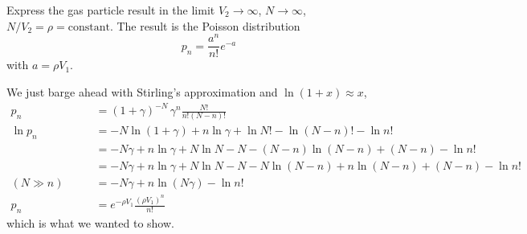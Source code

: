 

Express the gas particle result in the limit $V_2 \rightarrow \infty$, $N \rightarrow \infty$, $N/V_2 = \rho = \text{constant}$.
The result is the Poisson distribution
\begin{equation*}
p_n = \frac{a^n}{n!} e^{-a}
\end{equation*}
with $a = \rho V_1$.


We just barge ahead with Stirling's approximation and $\ln(1+x) \approx x$,
\begin{align*}
p_n
&= (1 + \gamma)^{-N} \, \gamma^n \frac{N!}{n! (N - n)!} \\
\ln p_n
&= -N \ln (1 + \gamma) + n \ln \gamma + \ln N! - \ln (N - n)! - \ln n! \\
&= -N \gamma + n \ln \gamma + N \ln N - N - (N - n)\ln(N - n) + (N - n) - \ln n! \\
&= -N \gamma + n \ln \gamma + N \ln N - N - N \ln(N - n) + n \ln(N - n) + (N - n) - \ln n! \\
(N \gg n) \qquad
&= -N \gamma + n \ln (N \gamma) - \ln n! \\
p_n
&= e^{-\rho V_1} \frac{(\rho V_1)^n}{n!}
\end{align*}
which is what we wanted to show.
